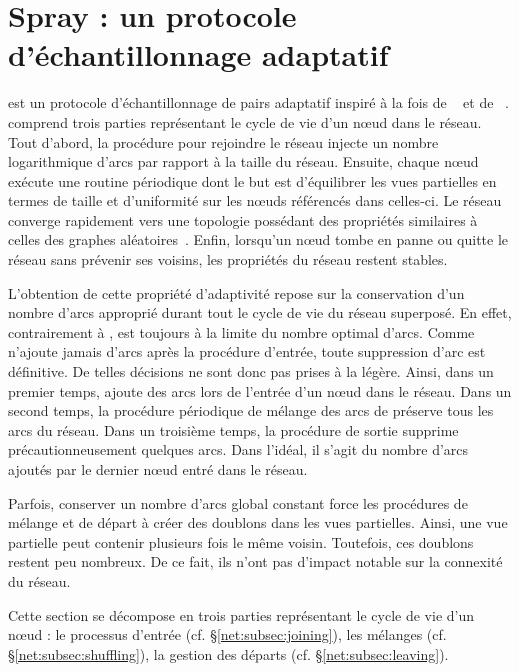 
\section{Spray : un protocole d'échantillonnage adaptatif}
\label{net:sec:spray}

\SPRAY est un protocole d'échantillonnage de pairs adaptatif inspiré à la fois
de \SCAMP~\cite{ganesh2003peer} et de \CYCLON~\cite{voulgaris2005cyclon}. \SPRAY
comprend trois parties représentant le cycle de vie d'un nœud dans le
réseau. Tout d'abord, la procédure pour rejoindre le réseau injecte un nombre
logarithmique d'arcs par rapport à la taille du réseau.  Ensuite, chaque nœud
exécute une routine périodique dont le but est d'équilibrer les vues partielles
en termes de taille et d'uniformité sur les nœuds référencés dans celles-ci. Le
réseau converge rapidement vers une topologie possédant des propriétés
similaires à celles des graphes aléatoires~\cite{erdos1959random}. Enfin,
lorsqu'un nœud tombe en panne ou quitte le réseau sans prévenir ses voisins, les
propriétés du réseau restent stables.

L'obtention de cette propriété d'adaptivité repose sur la conservation d'un
nombre d'arcs approprié durant tout le cycle de vie du réseau superposé.  En
effet, contrairement à \CYCLON, \SPRAY est toujours à la limite du nombre
optimal d'arcs. Comme \SPRAY n'ajoute jamais d'arcs après la procédure d'entrée,
toute suppression d'arc est définitive. De telles décisions ne sont donc pas
prises à la légère. Ainsi, dans un premier temps, \SPRAY ajoute des arcs lors de
l'entrée d'un nœud dans le réseau. Dans un second temps, la procédure périodique
de mélange des arcs de \SPRAY préserve tous les arcs du réseau.  Dans un
troisième temps, la procédure de sortie supprime précautionneusement quelques
arcs. Dans l'idéal, il s'agit du nombre d'arcs ajoutés par le dernier nœud entré
dans le réseau.

Parfois, conserver un nombre d'arcs global constant force les procédures de
mélange et de départ à créer des doublons dans les vues partielles. Ainsi, une
vue partielle peut contenir plusieurs fois le même voisin. Toutefois, ces
doublons restent peu nombreux. De ce fait, ils n'ont pas d'impact notable sur la
connexité du réseau.

Cette section se décompose en trois parties représentant le cycle de vie d'un
nœud : le processus d'entrée (cf. §\ref{net:subsec:joining}), les mélanges
(cf. §\ref{net:subsec:shuffling}), la gestion des départs
(cf. §\ref{net:subsec:leaving}).

